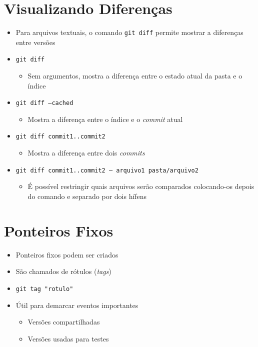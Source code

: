 \documentclass{beamer}
\newenvironment{slide}{\begin{frame}{\insertsection}}{\end{frame}}
\begin{document}
\section{Visualizando Diferenças}
\begin{slide}
    \begin{itemize}
        \item Para arquivos textuais, o comando \texttt{git diff} permite
            mostrar a diferenças entre versões
        \pause
        \item \texttt{git diff}
        \begin{itemize}
            \item Sem argumentos, mostra a diferença entre o estado atual da
                pasta e o índice
        \end{itemize}
        \pause
        \item \texttt{git diff --cached}
        \begin{itemize}
            \item Mostra a diferença entre o índice e o \emph{commit} atual
        \end{itemize}
        \pause
        \item \texttt{git diff commit1..commit2}
        \begin{itemize}
            \item Mostra a diferença entre dois \emph{commits}
        \end{itemize}
        \pause
        \item \texttt{git diff commit1..commit2 -- arquivo1 pasta/arquivo2}
        \begin{itemize}
            \item É possível restringir quais arquivos serão comparados
                colocando-os depois do comando e separado por dois hífens
        \end{itemize}
    \end{itemize}
\end{slide}

\section{Ponteiros Fixos}
\begin{slide}
    \begin{itemize}
        \item Ponteiros fixos podem ser criados
        \pause
        \item São chamados de rótulos (\emph{tags})
        \pause
        \item \texttt{git tag "rotulo"}
        \pause
        \item Útil para demarcar eventos importantes
        \begin{itemize}
            \pause
            \item Versões compartilhadas
            \pause
            \item Versões usadas para testes
        \end{itemize}
    \end{itemize}
\end{slide}
\end{document}
